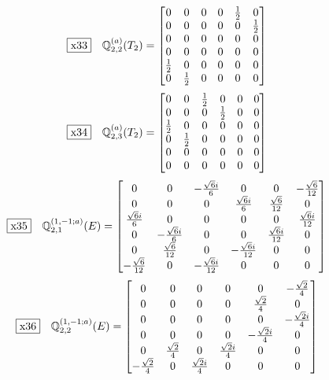 \documentclass[fleqn,10pt,landscape]{jsarticle}
\begin{document}
\begin{dmath*}
\fbox{x33}\quad \mathbb{Q}_{2,2}^{(a)}(T_{2})=\begin{bmatrix} 0 & 0 & 0 & 0 & \frac{1}{2} & 0 \\ 0 & 0 & 0 & 0 & 0 & \frac{1}{2} \\ 0 & 0 & 0 & 0 & 0 & 0 \\ 0 & 0 & 0 & 0 & 0 & 0 \\ \frac{1}{2} & 0 & 0 & 0 & 0 & 0 \\ 0 & \frac{1}{2} & 0 & 0 & 0 & 0 \end{bmatrix}
\end{dmath*}
\begin{dmath*}
\fbox{x34}\quad \mathbb{Q}_{2,3}^{(a)}(T_{2})=\begin{bmatrix} 0 & 0 & \frac{1}{2} & 0 & 0 & 0 \\ 0 & 0 & 0 & \frac{1}{2} & 0 & 0 \\ \frac{1}{2} & 0 & 0 & 0 & 0 & 0 \\ 0 & \frac{1}{2} & 0 & 0 & 0 & 0 \\ 0 & 0 & 0 & 0 & 0 & 0 \\ 0 & 0 & 0 & 0 & 0 & 0 \end{bmatrix}
\end{dmath*}
\begin{dmath*}
\fbox{x35}\quad \mathbb{Q}_{2,1}^{(1,-1;a)}(E)=\begin{bmatrix} 0 & 0 & - \frac{\sqrt{6} i}{6} & 0 & 0 & - \frac{\sqrt{6}}{12} \\ 0 & 0 & 0 & \frac{\sqrt{6} i}{6} & \frac{\sqrt{6}}{12} & 0 \\ \frac{\sqrt{6} i}{6} & 0 & 0 & 0 & 0 & \frac{\sqrt{6} i}{12} \\ 0 & - \frac{\sqrt{6} i}{6} & 0 & 0 & \frac{\sqrt{6} i}{12} & 0 \\ 0 & \frac{\sqrt{6}}{12} & 0 & - \frac{\sqrt{6} i}{12} & 0 & 0 \\ - \frac{\sqrt{6}}{12} & 0 & - \frac{\sqrt{6} i}{12} & 0 & 0 & 0 \end{bmatrix}
\end{dmath*}
\begin{dmath*}
\fbox{x36}\quad \mathbb{Q}_{2,2}^{(1,-1;a)}(E)=\begin{bmatrix} 0 & 0 & 0 & 0 & 0 & - \frac{\sqrt{2}}{4} \\ 0 & 0 & 0 & 0 & \frac{\sqrt{2}}{4} & 0 \\ 0 & 0 & 0 & 0 & 0 & - \frac{\sqrt{2} i}{4} \\ 0 & 0 & 0 & 0 & - \frac{\sqrt{2} i}{4} & 0 \\ 0 & \frac{\sqrt{2}}{4} & 0 & \frac{\sqrt{2} i}{4} & 0 & 0 \\ - \frac{\sqrt{2}}{4} & 0 & \frac{\sqrt{2} i}{4} & 0 & 0 & 0 \end{bmatrix}
\end{dmath*}
\end{document}
